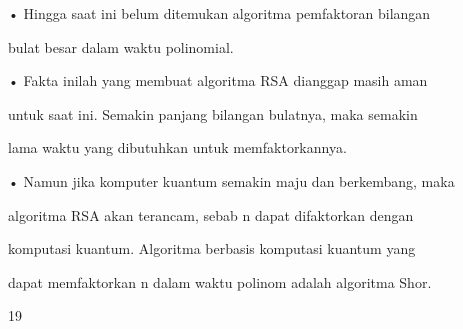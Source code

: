 \documentclass{article}
\begin{document}

• Hingga saat ini belum ditemukan algoritma pemfaktoran bilangan 

bulat besar dalam waktu polinomial. 

• Fakta inilah yang membuat algoritma RSA dianggap masih aman 

untuk saat ini. Semakin panjang bilangan bulatnya, maka semakin 

lama waktu yang dibutuhkan untuk memfaktorkannya. 

• Namun jika komputer kuantum semakin maju dan berkembang, maka 

algoritma RSA akan terancam, sebab n dapat difaktorkan dengan 

komputasi kuantum. Algoritma berbasis komputasi kuantum yang 

dapat memfaktorkan n dalam waktu polinom adalah algoritma Shor.

19
\end{document}
